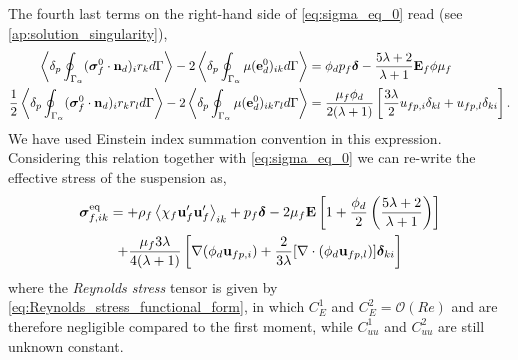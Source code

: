 The fourth last terms on the right-hand side of \ref{eq:sigma_eq_0} read (see \ref{ap:solution_singularity}), 
\begin{align*}
    \left<\delta_p \oint_{\Gamma_{\alpha}} (\bm{\sigma}_f^0 \cdot \textbf{n}_d)_ir_k d\Gamma\right> -
    2\left<\delta_p \oint_{\Gamma_{\alpha}} {\mu(\textbf{e}_d^0)_{ik}} d\Gamma\right> 
    &= 
    \phi_d p_f\bm\delta
    - \frac{5\lambda +2}{\lambda +1}
    \textbf{E}_f \phi \mu_f
    \\
    \frac{1}{2}\left<\delta_p \oint_{\Gamma_{\alpha}} (\bm{\sigma}_f^0 \cdot \textbf{n}_d)_ir_kr_l d\Gamma\right> -
    2\left<\delta_p \oint_{\Gamma_{\alpha}} {\mu(\textbf{e}_d^0)_{ik} r_l} d\Gamma\right> 
    &= 
    \frac{\mu_f\phi_d}{2(\lambda +1) }
    \left[
        \frac{3\lambda}{2} 
        u_{fp,i}\delta_{kl}
        +  u_{fp,l}\delta_{ki}
    \right]. 
\end{align*}
We have used Einstein index summation convention in this expression. 
Considering this relation together with \ref{eq:sigma_eq_0} we can re-write the effective stress of the suspension as, 
\begin{multline}
    \bm{\sigma}^\text{eq}_{f,ik} =
    + \rho_f\left<\chi_f\textbf{u}_f'\textbf{u}_f'\right>_{ik} 
    + p_f \bm\delta
    - 2 \mu_f \textbf{E}\left[
        1
        +\frac{\phi_d}{2}\left(
            \frac{5\lambda +2}{\lambda +1}
        \right)
    \right]\\
    + 
    \frac{\mu_f 3\lambda}{4(\lambda +1) }
    \left[
        \mathbf{\nabla} (\phi_d\textbf{u}_{fp,i})
        +  
        \frac{2}{3\lambda} 
        [\mathbf{\nabla}\cdot (\phi_d\textbf{u}_{fp,l})]\bm\delta_{ki}
    \right]
\end{multline} 
where the \textit{Reynolds stress} tensor is given by \ref{eq:Reynolds_stress_functional_form}, in which $C_E^1$ and $C_E^2 = \mathcal{O}(Re)$ and are therefore negligible compared to the first moment, while $C_{uu}^1$ and $C_{uu}^2$ are still unknown constant. 
